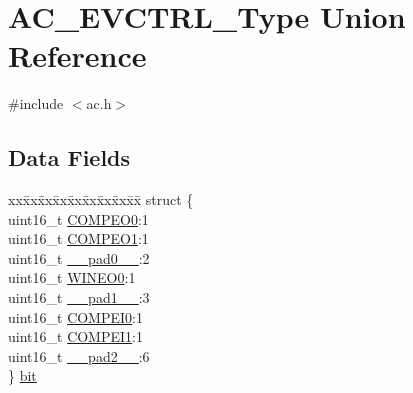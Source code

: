 \hypertarget{union_a_c___e_v_c_t_r_l___type}{}\section{A\+C\+\_\+\+E\+V\+C\+T\+R\+L\+\_\+\+Type Union Reference}
\label{union_a_c___e_v_c_t_r_l___type}


{\ttfamily \#include $<$ac.\+h$>$}

\subsection*{Data Fields}
\begin{DoxyCompactItemize}
\item 
\begin{tabbing}
xx\=xx\=xx\=xx\=xx\=xx\=xx\=xx\=xx\=\kill
struct \{\\
\>uint16\_t \mbox{\hyperlink{union_a_c___e_v_c_t_r_l___type_ae6fbd3c33a330a15f843c911b1795b59}{COMPEO0}}:1\\
\>uint16\_t \mbox{\hyperlink{union_a_c___e_v_c_t_r_l___type_aa65c890231bc822627856f16ae5dbc9d}{COMPEO1}}:1\\
\>uint16\_t \mbox{\hyperlink{union_a_c___e_v_c_t_r_l___type_a77132c2c26a75f5b8751b235cda23828}{\_\_pad0\_\_}}:2\\
\>uint16\_t \mbox{\hyperlink{union_a_c___e_v_c_t_r_l___type_a04bb6b9055a0b55cf8e4d2c6aac67303}{WINEO0}}:1\\
\>uint16\_t \mbox{\hyperlink{union_a_c___e_v_c_t_r_l___type_ab72e3a1f2f7db8695c60c658f5a0f11a}{\_\_pad1\_\_}}:3\\
\>uint16\_t \mbox{\hyperlink{union_a_c___e_v_c_t_r_l___type_aee44a577e7ca4b57e67378bed8bca433}{COMPEI0}}:1\\
\>uint16\_t \mbox{\hyperlink{union_a_c___e_v_c_t_r_l___type_a757c1bdacc34f26cb7a514f07ab4eba4}{COMPEI1}}:1\\
\>uint16\_t \mbox{\hyperlink{union_a_c___e_v_c_t_r_l___type_a82701c5ec65a0fca9a84d8edc46a8192}{\_\_pad2\_\_}}:6\\
\} \mbox{\hyperlink{union_a_c___e_v_c_t_r_l___type_adb8acee5ff764b270ce24372fd1ca5f4}{bit}}\\


\end{tabbing}
\end{DoxyCompactItemize}

